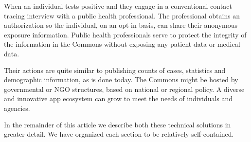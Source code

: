 When an individual tests positive and they engage in a conventional contact tracing interview with a public health professional. The professional obtains an authorization so the individual, on an opt-in basis, can share their anonymous exposure information.  Public health professionals serve to protect the integrity of the information in the Commons without exposing any patient data or medical data. 

Their actions are quite similar to publishing counts of cases, statistics and demographic information, as is done today.  The Commons might be hosted by governmental or NGO structures, based on national or regional policy.  A diverse and innovative app ecosystem can grow to meet the needs of individuals and agencies.

In the remainder of this article we describe both these technical solutions in greater detail.  
We have organized each section to be relatively self-contained.
